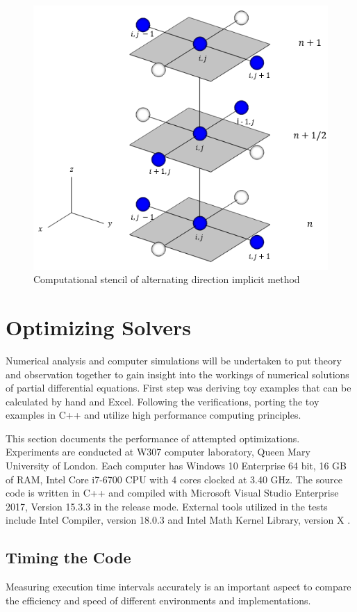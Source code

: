 \documentclass[12pt, oneside]{book}
\theoremstyle{plain}
\theoremstyle{definition}
\begin{document}
\begin{figure}[!htb]
    \centering
        \includegraphics[scale=0.8]{ADI.png}
    \caption{Computational stencil of alternating direction implicit method}
\end{figure}

\chapter{Optimizing Solvers}
Numerical analysis and computer simulations will be undertaken to put theory and observation together to gain insight into the workings of numerical solutions of partial differential equations. First step was deriving toy examples that can be calculated by hand and Excel. Following the verifications, porting the toy examples in C++ and utilize high performance computing principles.

This section documents the performance of attempted optimizations. Experiments  are  conducted  at  W307 computer laboratory, Queen Mary University of London.  Each computer has Windows 10 Enterprise 64 bit, 16 GB of RAM, Intel Core i7-6700 CPU with 4 cores clocked at 3.40 GHz.  The source code is written in C++ and compiled with Microsoft Visual Studio Enterprise 2017, Version 15.3.3 in the release mode. External tools  utilized  in  the  tests  include   Intel Compiler, version 18.0.3 and Intel Math  Kernel  Library, version X .  

\section{Timing the Code}
Measuring execution time intervals accurately is an important aspect to compare the efficiency and speed of different environments and implementations.
\end{document}
